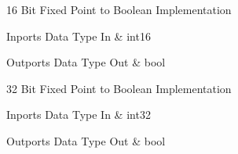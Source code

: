 16 Bit Fixed Point to Boolean Implementation

\begin{XtoCtabular}{Inports Data Type}
In & int16\tabularnewline
\hline
\end{XtoCtabular}

\begin{XtoCtabular}{Outports Data Type}
Out & bool\tabularnewline
\hline
\end{XtoCtabular}

\ifdefined \AddTestReports
{}
\fi
{}
\nopagebreak[0]

32 Bit Fixed Point to Boolean Implementation

\begin{XtoCtabular}{Inports Data Type}
In & int32\tabularnewline
\hline
\end{XtoCtabular}

\begin{XtoCtabular}{Outports Data Type}
Out & bool\tabularnewline
\hline
\end{XtoCtabular}

\ifdefined \AddTestReports
{}
\fi
